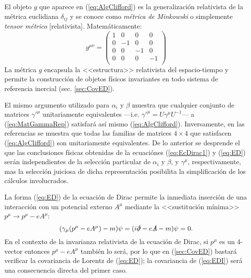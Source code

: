 
El objeto $g$ que aparece en (\ref{eq:AlgClifford}) es la generalización relativista de la métrica euclidiana $\delta_{i j}$ y se conoce como \textit{métrica de Minkowski} o simplemente \textit{tensor métrico} [relativista]. Matemáticamente:
\begin{equation}\label{eq:Metrica} 
g^{\mu\nu}=	\begin{pmatrix}
			1 & 0 & 0 & 0 \\
			0 & -1 & 0 & 0 \\
			0 & 0 & -1 & 0 \\
			0 & 0 & 0 & -1 \\
			\end{pmatrix}
\end{equation}
La métrica $g$ encapsula la <<estructura>> relativista del espacio-tiempo y permite la construcción de objetos físicos invariantes en todo sistema de referencia inercial (sec. \ref{sec:CovED}).

El mismo argumento utilizado para $\alpha_i$ y $\beta$ muestra que cualquier conjunto de matrices ${\gamma'}^{\mu}$ unitariamente equivalentes ---i.e. ${\gamma'}^{\mu}= U\gamma^{\mu}U^{-1}$--- a (\ref{eq:MatGammaRep}) satisfará así mismo (\ref{eq:AlgClifford}). Inversamente, en las referencias \cite{Good,GreinerRQM} se muestra que todas las familias de matrices $4\times 4$ que satisfacen (\ref{eq:AlgClifford}) son unitariamente equivalentes. De lo anterior se desprende el que las conclusiones físicas obtenidas de la ecuaciónes (\ref{eq:EcDirac1}) y (\ref{eq:ED}) serán independientes de la selección particular de $\alpha_i$ y $\beta$, y $\gamma^{\mu}$, respectivamente, mas la selección juiciosa de dicha representación posibilita la simplificación de los cálculos involucrados.

La forma (\ref{eq:ED}) de la ecuación de Dirac permite la inmediata inserción de una interacción con un potencial externo $A^{\mu}$ mediante la <<sustitución mínima>> $p^{\mu}\rightarrow p^{\mu}-eA^{\mu}$:\footnotemark
\begin{equation}\label{eq:EDI}
	(\gamma_{\mu}(p^{\mu}-eA^{\mu})-m)\psi=(i\slashed{\partial}-e\slashed{A}-m)\psi=0.
\end{equation}
En el contexto de la invarianza relativista de la ecuación de Dirac, si $p^{\mu}$ es un 4-vector entonces $p^{\mu}-eA^{\mu}$ también lo será, por lo que en (\ref{sec:CovED}) bastará verificar la covariancia de Lorentz de (\ref{eq:ED}); la covariancia de (\ref{eq:EDI}) será una consecuencia directa del primer caso. 

